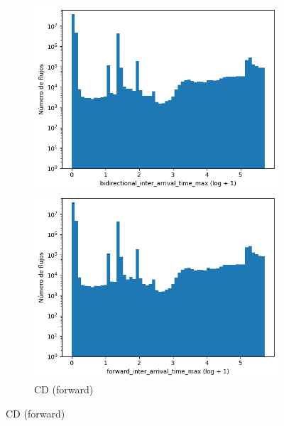 \begin{figure}[H]
    \centering
    \hfill
    \begin{subfigure}[b]{0.26\textwidth}
        \centering
        \includegraphics[width=\textwidth]{media/packet_pincer_cicddos/bidirectional_inter_arrival_time_max_log_x_log_y.png}
        \caption{CD (bidir.)}
        \includegraphics[width=\textwidth]{media/packet_pincer_cicddos/forward_inter_arrival_time_max_log_x_log_y.png}
        \caption{CD (forward)}

\end{subfigure}
\end{figure}
